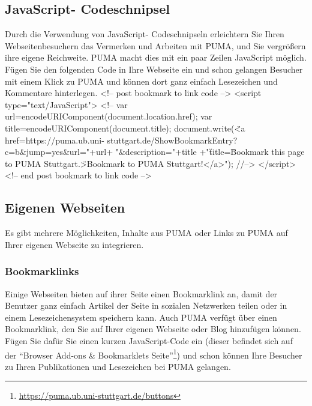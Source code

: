 \subsection{JavaScript- Codeschnipsel}
Durch die Verwendung von JavaScript- Codeschnipseln erleichtern Sie Ihren Webseitenbesuchern das Vermerken und Arbeiten mit PUMA, und Sie vergrößern ihre eigene Reichweite. PUMA macht dies mit ein paar Zeilen JavaScript möglich. Fügen Sie den folgenden Code in Ihre Webseite ein und schon gelangen Besucher mit einem Klick zu PUMA und können dort ganz einfach Lesezeichen und Kommentare hinterlegen.
\newline
\newline
<!-- post bookmark to link code -->\newline
      <script type="text/JavaScript">\newline
      <!--\newline
      var url=encodeURIComponent(document.location.href);\newline
      var title=encodeURIComponent(document.title);\newline
      document.write(\"<a href=https://puma.ub.uni-	stuttgart.de/ShowBookmarkEntry?c=b\&jump=yes\&url="+url+ "\&description="+title +"\" title=\"Bookmark this page to PUMA Stuttgart.\">Bookmark to PUMA Stuttgart!</a>");\newline%
      //-->\newline
      </script>\newline
      <!-- end post bookmark to link code -->\newline

\subsection{Eigenen Webseiten}
Es gibt mehrere Möglichkeiten, Inhalte aus PUMA oder Links zu PUMA auf Ihrer eigenen Webseite zu integrieren.

\subsubsection{Bookmarklinks}
Einige Webseiten bieten  auf ihrer Seite einen Bookmarklink an, damit der Benutzer ganz einfach Artikel der Seite in sozialen Netzwerken teilen oder in einem Lesezeichensystem speichern kann. 
\newline Auch PUMA verfügt über einen Bookmarklink, den Sie auf Ihrer eigenen Webseite oder Blog hinzufügen können. Fügen Sie dafür Sie einen kurzen JavaScript-Code ein (dieser befindet sich auf der \enquote{Browser Add-ons \& Bookmarklets Seite}\footnote{\url{https://puma.ub.uni-stuttgart.de/buttons}}) und schon können Ihre Besucher zu Ihren Publikationen und Lesezeichen bei PUMA gelangen.

